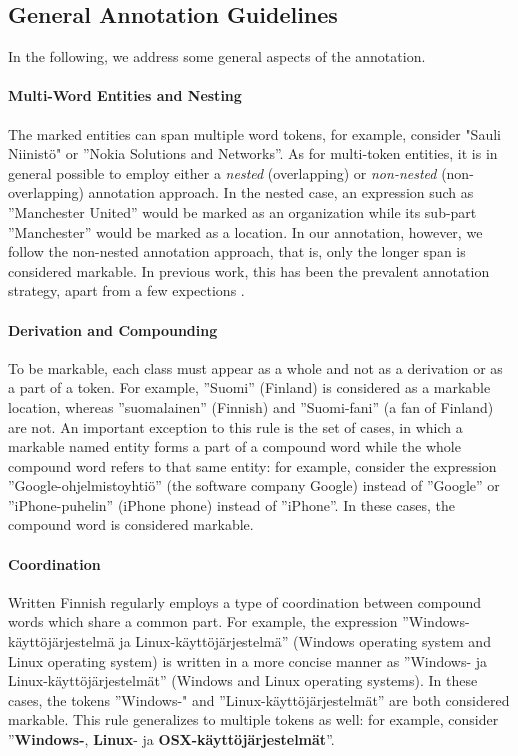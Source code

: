 \documentclass[11pt]{article}
\begin{document}
\subsection{General Annotation Guidelines}

In the following, we address some general aspects of the annotation.

\paragraph{Multi-Word Entities and Nesting}

The marked entities can span multiple word tokens, for example, consider "Sauli Niinist\"o" or ''Nokia Solutions and Networks''. As for multi-token entities, it is in general possible to employ either a \textit{nested} (overlapping) or \textit{non-nested} (non-overlapping) annotation approach. In the nested case, an expression such as ''Manchester United'' would be marked as an organization while its sub-part ''Manchester'' would be marked as a location.  In our annotation, however, we follow the non-nested annotation approach, that is, only the longer span is considered markable. In previous work, this has been the prevalent annotation strategy, apart from a few expections \citep{byrne2007,benikova2014}.

\paragraph{Derivation and Compounding}

To be markable, each class must appear as a whole and not as a derivation or as a part of a token. For example, ''Suomi'' (Finland) is considered as a markable location, whereas ''suomalainen'' (Finnish) and ''Suomi-fani'' (a fan of Finland) are not.  An important exception to this rule is the set of cases, in which a markable named entity forms a part of a compound word while the whole compound word refers to that same entity: for example, consider the expression ''Google-ohjelmistoyhti\"o'' (the software company Google) instead of  ''Google'' or ''iPhone-puhelin'' (iPhone phone) instead of ''iPhone''. In these cases, the compound word is considered markable.

\paragraph{Coordination}

Written Finnish regularly employs a type of coordination between compound words which share a common part. For example, the expression ''Windows-k\"aytt\"oj\"arjestelm\"a ja Linux-k\"aytt\"oj\"arjestelm\"a'' (Windows operating system and Linux operating system) is written in a more concise manner as ''Windows- ja Linux-k\"aytt\"oj\"arjestelm\"at'' (Windows and Linux operating systems). In these cases, the tokens ''Windows-" and ''Linux-k\"aytt\"oj\"arjestelm\"at'' are both considered markable. This rule generalizes to multiple tokens as well: for example, consider ''\textbf{Windows-}, \textbf{Linux}- ja \textbf{OSX-k\"aytt\"oj\"arjestelm\"at}''.
\end{document}
